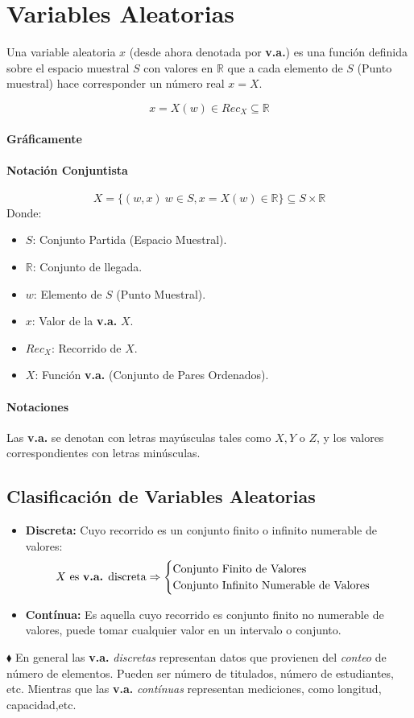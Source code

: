 \chapter{Variables Aleatorias}
Una variable aleatoria $x$ (desde ahora denotada por \textbf{v.a.}) es una función definida sobre el espacio muestral $S$ con valores en $\mathbb{R}$ que a cada elemento de $S$ (Punto muestral) hace corresponder un número real $x=X$.

$$x=X(w) \in Rec_X \subseteq \mathbb{R}$$ 
\subsubsection{Gráficamente}
\subsubsection{Notación Conjuntista}
$$X = \lbrace (w,x)\ w\in S, x=X(w)\in \mathbb{R} \rbrace \subseteq S\times  \mathbb{R}$$
Donde:
\begin{itemize}
\item $S$: Conjunto Partida (Espacio Muestral).
\item $\mathbb{R}$: Conjunto de llegada.
\item $w$: Elemento de $S$ (Punto Muestral).
\item $x$: Valor de la \textbf{v.a.} $X$.
\item $Rec_X$: Recorrido de $X$.
\item $X$: Función \textbf{v.a.} (Conjunto de Pares Ordenados).
\end{itemize}
\subsubsection{Notaciones}
Las \textbf{v.a.} se denotan con letras mayúsculas tales como $X,Y$ o $Z$, y los valores correspondientes con letras minúsculas.
\section{Clasificación de Variables Aleatorias}
\begin{itemize}
\item \textbf{Discreta:} Cuyo recorrido es un conjunto finito o infinito numerable de valores:
$$
X \text{ es \textbf{v.a.} discreta} \Rightarrow
\begin{cases}
\text{Conjunto Finito de Valores} \\
\text{Conjunto Infinito Numerable de Valores}
\end{cases}
$$
\item \textbf{Contínua:} Es aquella cuyo recorrido es conjunto finito no numerable de valores, puede tomar cualquier valor en un intervalo o conjunto.
\end{itemize}
$\blacklozenge$ En general las \textbf{v.a.} \textit{discretas} representan datos que provienen del \textit{conteo} de número de elementos. Pueden ser número de titulados, número de estudiantes, etc. Mientras que las \textbf{v.a.} \textit{contínuas} representan mediciones, como longitud, capacidad,etc.
